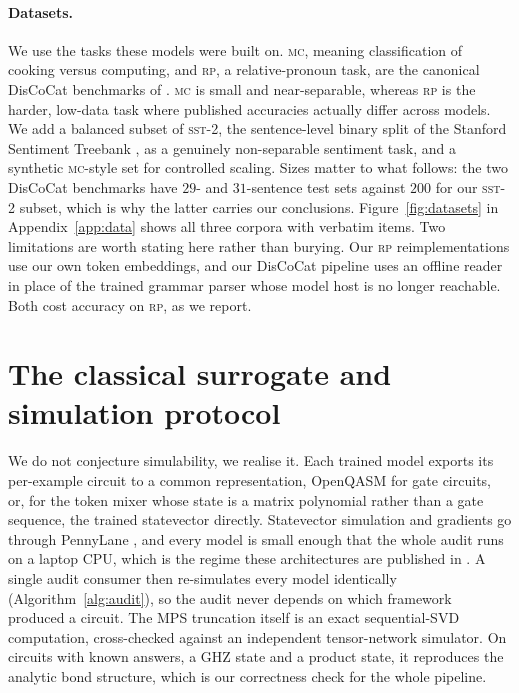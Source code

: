 \documentclass[10pt]{article}
\begin{document}
\paragraph{Datasets.} We use the tasks these models were built on. \textsc{mc}, meaning
classification of cooking versus computing, and \textsc{rp}, a relative-pronoun task, are the
canonical DisCoCat benchmarks of \citet{lorenz2021}. \textsc{mc} is small and near-separable,
whereas \textsc{rp} is the harder, low-data task where published accuracies actually differ across
models. We add a balanced subset of \textsc{sst-2}, the sentence-level binary split of the Stanford
Sentiment Treebank \citep{socher2013}, as a genuinely non-separable sentiment task, and
a synthetic \textsc{mc}-style set for controlled scaling. Sizes matter to what follows: the two DisCoCat benchmarks have $29$- and
$31$-sentence test sets against $200$ for our \textsc{sst-2} subset, which is why the latter
carries our conclusions. Figure~\ref{fig:datasets} in Appendix~\ref{app:data} shows all three
corpora with verbatim items. Two limitations are worth stating here rather than burying. Our \textsc{rp}
reimplementations use our own token embeddings, and our DisCoCat pipeline uses an offline reader in
place of the trained grammar parser whose model host is no longer reachable. Both cost accuracy on
\textsc{rp}, as we report.

\section{The classical surrogate and simulation protocol}
\label{sec:protocol}

We do not conjecture simulability, we realise it. Each trained model exports its per-example circuit
to a common representation, OpenQASM for gate circuits, or, for the token mixer whose state is a
matrix polynomial rather than a gate sequence, the trained statevector directly. Statevector
simulation and gradients go through PennyLane \citep{bergholm2018}, and every model is small enough
that the whole audit runs on a laptop CPU, which is the regime these architectures are published in
\citep{preskill2018}. A single audit
consumer then re-simulates every model identically (Algorithm~\ref{alg:audit}), so the audit never
depends on which framework produced a circuit. The MPS truncation itself is an exact sequential-SVD
computation, cross-checked against an independent tensor-network simulator. On circuits with known
answers, a GHZ state and a product state, it reproduces the analytic bond structure, which is our
correctness check for the whole pipeline.
\end{document}
